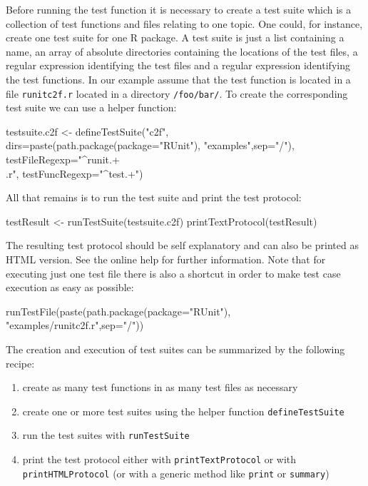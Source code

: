 \documentclass[12pt, a4paper]{article}
\begin{document}
Before running the test function it is necessary to create a test suite which is a collection of test functions and files relating to one topic. One could, for instance, create one test suite for one R package. A test suite is just a list containing a name, an array of absolute directories containing the locations of the test files, a regular expression identifying the test files and a regular expression identifying the test functions. In our example assume that the test function is located in a file {\tt runitc2f.r} located in a directory {\tt /foo/bar/}. To create the corresponding test suite we can use a helper function:
\begin{Sinput}
testsuite.c2f <- defineTestSuite("c2f",
                 dirs=paste(path.package(package="RUnit"),
                            "examples",sep="/"),
                 testFileRegexp="^runit.+\\.r",
                 testFuncRegexp="^test.+")
\end{Sinput}
All that remains is to run the test suite and print the test protocol:
\begin{Sinput}
testResult <- runTestSuite(testsuite.c2f)
printTextProtocol(testResult)
\end{Sinput}
The resulting test protocol should be self explanatory and can also be printed as HTML version. See the online help for further information.
Note that for executing just one test file there is also a shortcut in order to make test case execution as easy as possible:
 \begin{Sinput}
runTestFile(paste(path.package(package="RUnit"),
            "examples/runitc2f.r",sep="/"))
\end{Sinput}

The creation and execution of test suites can be summarized by the following recipe:
\begin{enumerate}
\item{create as many test functions in as many test files as necessary }
\item{create one or more test suites using the helper function {\tt defineTestSuite}}
\item{run the test suites with {\tt runTestSuite}}
\item{print the test protocol either with {\tt printTextProtocol} or with {\tt printHTMLProtocol} (or with a generic method like {\tt print} or {\tt summary})}
\end{enumerate}
\end{document}
